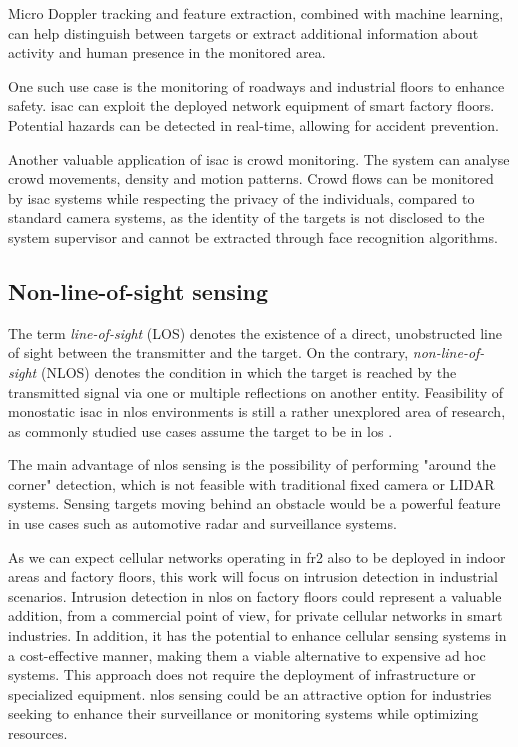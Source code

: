 	Micro Doppler tracking and feature extraction, combined with machine learning, can help distinguish between targets or extract additional information about activity and human presence in the monitored area.
	
	One such use case is the monitoring of roadways and industrial floors to enhance safety. \Gls{isac} can exploit the deployed network equipment of smart factory floors. Potential hazards can be detected in real-time, allowing for accident prevention. 
	
	Another valuable application of \gls{isac} is crowd monitoring. 
	The system can analyse crowd movements, density and motion patterns. 
	Crowd flows can be monitored by \gls{isac} systems while respecting the privacy of the individuals, compared to standard camera systems, as the identity of the targets is not disclosed to the system supervisor and cannot be extracted through face recognition algorithms.

	
	\subsection{Non-line-of-sight sensing}
	
	
	
	The term \textit{line-of-sight} (LOS)  denotes the existence of a direct, unobstructed line of sight between the transmitter and the target. On the contrary, \textit{non-line-of-sight} (NLOS) denotes the condition in which the target is reached by the transmitted signal via one or multiple reflections on another entity. 
	Feasibility of monostatic \gls{isac} in \gls{nlos} environments is still a rather unexplored area of research, as commonly studied use cases assume the target to be in \gls{los} \cite{Gustaffson_NLOS_radar}.
	
	The main advantage of \gls{nlos} sensing is the possibility of performing "around the corner" detection, which is not feasible with traditional fixed camera or LIDAR systems. 
	Sensing targets moving behind an obstacle would be a powerful feature in use cases such as automotive radar and surveillance systems.
	
	As we can expect cellular networks operating in \gls{fr2} also to be deployed in indoor areas and factory floors, this work will focus on intrusion detection in industrial scenarios.
	Intrusion detection in \gls{nlos} on factory floors could represent a valuable addition, from a commercial point of view, for private cellular networks in smart industries.
	In addition, it has the potential to enhance cellular sensing systems in a cost-effective manner, making them a viable alternative to expensive ad hoc systems. This approach does not require the deployment of infrastructure or specialized equipment. 
	\gls{nlos} sensing could be an attractive option for industries seeking to enhance their surveillance or monitoring systems while optimizing resources.
	
